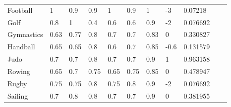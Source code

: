 \documentclass[a4paper]{article}
\begin{document}
\begin{table}[h]
\begin{tabular}{|l|lllllll|l|ll}
    Football                                    & \multicolumn{1}{l|}{1}        & \multicolumn{1}{l|}{0.9}      & \multicolumn{1}{l|}{0.9}  & \multicolumn{1}{l|}{1}    & \multicolumn{1}{l|}{0.9}  & \multicolumn{1}{l|}{1}        & -3                      & 0.07218                                                &  &  \\ \cline{1-9}
    Golf                                        & \multicolumn{1}{l|}{0.8}      & \multicolumn{1}{l|}{1}        & \multicolumn{1}{l|}{0.4}  & \multicolumn{1}{l|}{0.6}  & \multicolumn{1}{l|}{0.6}  & \multicolumn{1}{l|}{0.9}      & -2                      & 0.076692                                               &  &  \\ \cline{1-9}
    Gymnastics                                  & \multicolumn{1}{l|}{0.63} & \multicolumn{1}{l|}{0.77} & \multicolumn{1}{l|}{0.8}  & \multicolumn{1}{l|}{0.7}  & \multicolumn{1}{l|}{0.7}  & \multicolumn{1}{l|}{0.83} & 0                       & 0.330827                                               &  &  \\ \cline{1-9}
    Handball                                    & \multicolumn{1}{l|}{0.65}     & \multicolumn{1}{l|}{0.65}     & \multicolumn{1}{l|}{0.8}  & \multicolumn{1}{l|}{0.6}  & \multicolumn{1}{l|}{0.7}  & \multicolumn{1}{l|}{0.85}     & -0.6                    & 0.131579                                               &  &  \\ \cline{1-9}
    Judo                                        & \multicolumn{1}{l|}{0.7}      & \multicolumn{1}{l|}{0.7}      & \multicolumn{1}{l|}{0.8}  & \multicolumn{1}{l|}{0.7}  & \multicolumn{1}{l|}{0.7}  & \multicolumn{1}{l|}{0.9}      & 1                       & 0.963158                                               &  &  \\ \cline{1-9}
    Rowing                                      & \multicolumn{1}{l|}{0.65}     & \multicolumn{1}{l|}{0.7}      & \multicolumn{1}{l|}{0.75} & \multicolumn{1}{l|}{0.65} & \multicolumn{1}{l|}{0.75} & \multicolumn{1}{l|}{0.85}     & 0                       & 0.478947                                               &  &  \\ \cline{1-9}
    Rugby                                       & \multicolumn{1}{l|}{0.75}     & \multicolumn{1}{l|}{0.75}     & \multicolumn{1}{l|}{0.8}  & \multicolumn{1}{l|}{0.75} & \multicolumn{1}{l|}{0.8}  & \multicolumn{1}{l|}{0.9}      & -2                      & 0.076692                                               &  &  \\ \cline{1-9}
    Sailing                                     & \multicolumn{1}{l|}{0.7}      & \multicolumn{1}{l|}{0.8}      & \multicolumn{1}{l|}{0.8}  & \multicolumn{1}{l|}{0.7}  & \multicolumn{1}{l|}{0.7}  & \multicolumn{1}{l|}{0.9}      & 0                       & 0.381955                                               &  &  \\ \cline{1-9}

\end{tabular}
\end{table}
\end{document}
